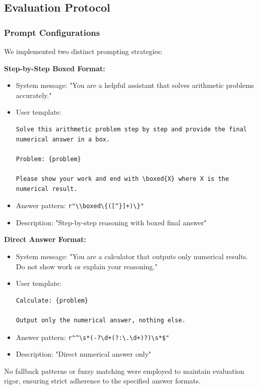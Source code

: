 \documentclass{article}
\begin{document}
\subsection{Evaluation Protocol}

\subsubsection{Prompt Configurations}

We implemented two distinct prompting strategies:

\textbf{Step-by-Step Boxed Format:}
\begin{itemize}
    \item System message: "You are a helpful assistant that solves arithmetic problems accurately."
    \item User template:
\begin{verbatim}
Solve this arithmetic problem step by step and provide the final
numerical answer in a box.

Problem: {problem}

Please show your work and end with \boxed{X} where X is the numerical result.
\end{verbatim}
    \item Answer pattern: \verb|r"\\boxed\{([^}]+)\}"|
    \item Description: "Step-by-step reasoning with boxed final answer"
\end{itemize}

\textbf{Direct Answer Format:}
\begin{itemize}
    \item System message: "You are a calculator that outputs only numerical results. Do not show work or explain your reasoning."
    \item User template:
\begin{verbatim}
Calculate: {problem}

Output only the numerical answer, nothing else.
\end{verbatim}
    \item Answer pattern: \verb|r"^\s*(-?\d+(?:\.\d+)?)\s*$"|
    \item Description: "Direct numerical answer only"
\end{itemize}

No fallback patterns or fuzzy matching were employed to maintain evaluation rigor, ensuring strict adherence to the specified answer formats.
\end{document}
